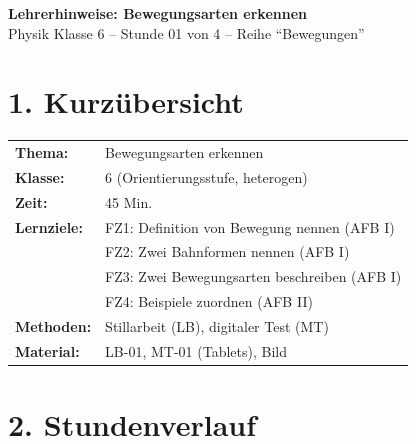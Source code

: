 \documentclass[11pt, a4paper]{article}
\newcommand{\fach}{Physik}
\newcommand{\thema}{Bewegungsarten erkennen}
\newcommand{\klasse}{6}
\newcommand{\stunde}{01}
\newcommand{\stundenanzahl}{4}
\newcommand{\reihe}{Bewegungen}
\begin{document}
\begin{center}
{\Large\textbf{\textcolor{fachfarbe}{Lehrerhinweise: \thema}}}\\[0.3em]
{\normalsize \fach{} Klasse \klasse{} -- Stunde \stunde{} von \stundenanzahl{} -- Reihe ``\reihe''}
\end{center}

\vspace{1em}


\section*{1. Kurzübersicht}

\begin{infobox}
\begin{tabular}{ll}
\textbf{Thema:} & Bewegungsarten erkennen \\
\textbf{Klasse:} & 6 (Orientierungsstufe, heterogen) \\
\textbf{Zeit:} & 45 Min. \\
\textbf{Lernziele:} & FZ1: Definition von Bewegung nennen (AFB I) \\
                    & FZ2: Zwei Bahnformen nennen (AFB I) \\
                    & FZ3: Zwei Bewegungsarten beschreiben (AFB I) \\
                    & FZ4: Beispiele zuordnen (AFB II) \\
\textbf{Methoden:} & Stillarbeit (LB), digitaler Test (MT) \\
\textbf{Material:} & LB-01, MT-01 (Tablets), Bild \\
\end{tabular}
\end{infobox}


\section*{2. Stundenverlauf}
\end{document}
